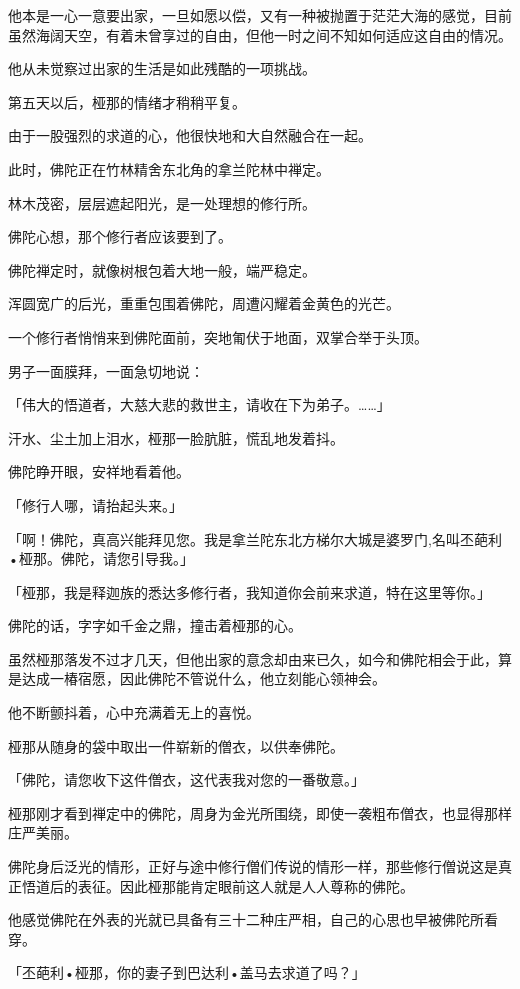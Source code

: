 \documentclass[twoside,openany]{book}
\begin{document}
他本是一心一意要出家，一旦如愿以偿，又有一种被抛置于茫茫大海的感觉，目前虽然海阔天空，有着未曾享过的自由，但他一时之间不知如何适应这自由的情况。

他从未觉察过出家的生活是如此残酷的一项挑战。

第五天以后，桠那的情绪才稍稍平复。

由于一股强烈的求道的心，他很快地和大自然融合在一起。

此时，佛陀正在竹林精舍东北角的拿兰陀林中禅定。

林木茂密，层层遮起阳光，是一处理想的修行所。

佛陀心想，那个修行者应该要到了。

佛陀禅定时，就像树根包着大地一般，端严稳定。

浑圆宽广的后光，重重包围着佛陀，周遭闪耀着金黄色的光芒。

一个修行者悄悄来到佛陀面前，突地匍伏于地面，双掌合举于头顶。

男子一面膜拜，一面急切地说：

「伟大的悟道者，大慈大悲的救世主，请收在下为弟子。……」

汗水、尘土加上泪水，桠那一脸肮脏，慌乱地发着抖。

佛陀睁开眼，安祥地看着他。

「修行人哪，请抬起头来。」

「啊！佛陀，真高兴能拜见您。我是拿兰陀东北方梯尔大城是婆罗门,名叫丕葩利•桠那。佛陀，请您引导我。」

「桠那，我是释迦族的悉达多修行者，我知道你会前来求道，特在这里等你。」

佛陀的话，字字如千金之鼎，撞击着桠那的心。

虽然桠那落发不过才几天，但他出家的意念却由来已久，如今和佛陀相会于此，算是达成一椿宿愿，因此佛陀不管说什么，他立刻能心领神会。

他不断颤抖着，心中充满着无上的喜悦。

桠那从随身的袋中取出一件崭新的僧衣，以供奉佛陀。

「佛陀，请您收下这件僧衣，这代表我对您的一番敬意。」

桠那刚才看到禅定中的佛陀，周身为金光所围绕，即使一袭粗布僧衣，也显得那样庄严美丽。

佛陀身后泛光的情形，正好与途中修行僧们传说的情形一样，那些修行僧说这是真正悟道后的表征。因此桠那能肯定眼前这人就是人人尊称的佛陀。

他感觉佛陀在外表的光就已具备有三十二种庄严相，自己的心思也早被佛陀所看穿。

「丕葩利•桠那，你的妻子到巴达利•盖马去求道了吗？」
\end{document}
